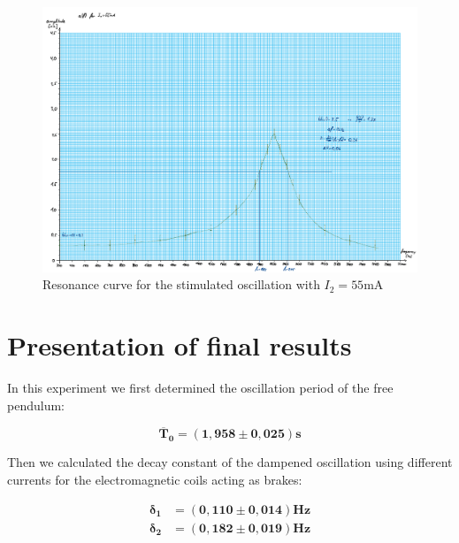 \documentclass{article}
\begin{document}
\begin{figure} [p]
    \centering
    \includegraphics[height=\textwidth, angle=90]{graphics/13-dia4.pdf}
    \caption{Resonance curve for the stimulated oscillation with $I_2 = 55$mA}
    \label{fig:4}
\end{figure}


\newpage
\section{Presentation of final results}

In this experiment we first determined the oscillation period of the free pendulum: 

\begin{equation}
    \bm{\overline{T}_0} = \bm{(1,958\pm0,025)} \textbf{s}
\end{equation}

Then we calculated the decay constant of the dampened oscillation using different currents for the electromagnetic coils acting as brakes:

\begin{equation}
    \begin{split}
        \bm{\delta_1} &= \bm{(0,110 \pm 0,014)} \textbf{Hz} \\
        \bm{\delta_2} &= \bm{(0,182 \pm 0,019)} \textbf{Hz} 
    \end{split}
\end{equation}
\end{document}
